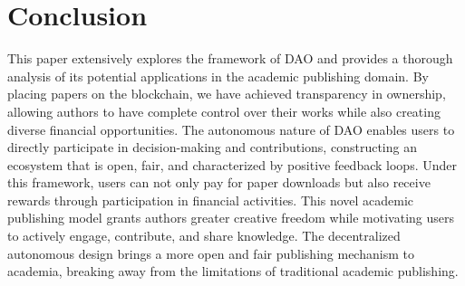 \documentclass[lettersize,journal]{IEEEtran}
\begin{document}






\section{Conclusion \label{sec:conclusion}}
This paper extensively explores the framework of DAO and provides a thorough analysis of its potential applications in the academic publishing domain. By placing papers on the blockchain, we have achieved transparency in ownership, allowing authors to have complete control over their works while also creating diverse financial opportunities. The autonomous nature of DAO enables users to directly participate in decision-making and contributions, constructing an ecosystem that is open, fair, and characterized by positive feedback loops.
Under this framework, users can not only pay for paper downloads but also receive rewards through participation in financial activities. This novel academic publishing model grants authors greater creative freedom while motivating users to actively engage, contribute, and share knowledge. The decentralized autonomous design brings a more open and fair publishing mechanism to academia, breaking away from the limitations of traditional academic publishing.
\end{document}
